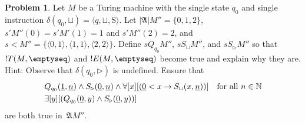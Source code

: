 \documentclass[10pt,a4paper]{article}
\theoremstyle{plain}
\theoremstyle{definition}
\newtheorem{prob}{Problem}[section]
\theoremstyle{remark}
\newenvironment{explain}{}{}
\providecommand{\lif}{\mathbin{\rightarrow}}
\providecommand{\lforall}{\mathord{\forall}}
\providecommand{\lexists}{\mathord{\exists}}
\providecommand{\Obj}{}
\providecommand{\Struct}{\ensuremath{\mathfrak{A}}}
\providecommand{\Domain}{\ensuremath{|\mathfrak{A}|}}
\providecommand{\Assign}{\ensuremath{s}}
\providecommand{\tuple}[1]{\langle #1 \rangle}
\providecommand{\num}[1]{\underline{#1}}
\providecommand{\Nat}{\ensuremath{\mathbb{N}}}
\providecommand{\TMblank}{\sqcup}
\providecommand{\TMstay}{\mathrm{S}}
\providecommand{\TMendtape}{\triangleright}
\begin{document}
\begin{explain}
  \begin{prob}
    Let $M$ be a Turing machine with the single state $q_0$ and single
    instruction $\delta(q_0,\TMblank) = \tuple{q,\TMblank,\TMstay}$.
    Let $\Domain{M''} = \{0, 1, 2\}$, $\Assign{\prime}{M''}(0) =
    \Assign{\prime}{M'}(1) = 1$ and $\Assign{\prime}{M''}(2) = 2$, and
    $\Assign{<}{M''} = \{\tuple{0,1}, \tuple{1,1}, \tuple{2,2}\}$.
    Define $\Assign{\Obj Q_{q_0}}{M''}$, $\Assign{\Obj
    S_{\TMblank}}{M''}$, and $\Assign{\Obj S_{\TMendtape}}{M''}$ so
    that $!T(M,\emptyseq)$ and $!E(M,\emptyseq)$ become true and
    explain why they are. Hint: Observe that $\delta(q_0, \TMendtape)$
    is undefined. Ensure that
    \begin{align*}
    & \Obj Q_{q_0}(\num{1}, \num{n}) \land \Obj S_{\TMendtape}(\num{0}, \num{n})
      \land 
      \lforall[x][(\num{0} < x \lif \Obj S_\TMblank(x, \num{n}))] \text{\quad for all $n \in \Nat$}\\
    & \lexists[y][(\Obj Q_{q_0}(\num{0}, y) \land \Obj S_{\TMendtape}(\num{0}, y))]
    \end{align*}
    are both true in~$\Struct{M''}$.
  \end{prob}
\end{explain}
\end{document}
